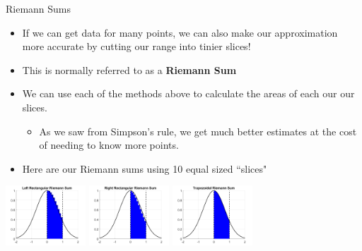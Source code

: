 {}\documentclass[letterpaper,
compress,
xcolor=x11names,
]{beamer}
\begin{document}
\begin{frame}{Riemann Sums}
	\footnotesize
	\begin{itemize}
		\item If we can get data for many points, we can also make our approximation more accurate by cutting our range into tinier slices!
		\item This is normally referred to as a \textbf{Riemann Sum}
		\item We can use each of the methods above to calculate the areas of each our our slices.
		\begin{itemize}
			\item As we saw from Simpson's rule, we get much better estimates at the cost of needing to know more points.
		\end{itemize}
		\item Here are our Riemann sums using 10 equal sized ``slices"
	\end{itemize}
	\begin{center}
		\includegraphics[height = 2.25cm]{left_riemann.png} \hspace{0.5cm}
		\includegraphics[height = 2.25cm]{right_riemann.png} \hspace{0.5cm}
		\includegraphics[height = 2.25cm]{trapz_riemann.png}	
	\end{center}
\end{frame}

\end{document}
